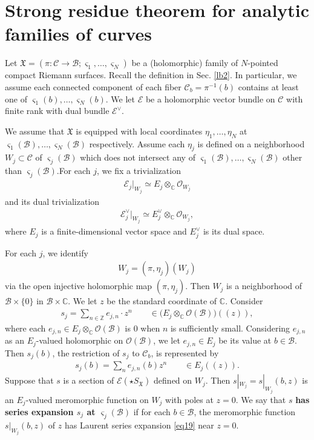 \documentclass[12pt,a4paper,notitlepage]{article}
\theoremstyle{definition}
\theoremstyle{plain}
\newcommand{\fk}{\mathfrak}
\newcommand{\mc}{\mathcal}
\newcommand{\scr}{\mathscr}
\newcommand{\sgm}{\varsigma}
\newcommand{\SX}{{S_{\fk X}}}
\newcommand{\Cbb}{\mathbb C}
\newcommand{\Zbb}{\mathbb Z}
\numberwithin{equation}{section}
\begin{document}
\appendix


\section{Strong residue theorem for analytic families of curves}\label{lb6}


Let $\fk X=(\pi:\mc C\rightarrow\mc B;\sgm_1,\dots,\sgm_N)$ be a (holomorphic) family of $N$-pointed compact Riemann surfaces. Recall the definition in Sec. \ref{lb2}. In particular, we assume each connected component of each fiber $\mc C_b=\pi^{-1}(b)$ contains at least one of $\sgm_1(b),\dots,\sgm_N(b)$. We let $\scr E$ be a holomorphic vector bundle on $\mc C$ with finite rank with dual bundle $\scr E^\vee$.

We assume that $\fk X$ is equipped with local coordinates $\eta_1,\dots,\eta_N$ at $\sgm_1(\mc B),\dots,\sgm_N(\mc B)$ respectively. Assume each $\eta_j$ is defined on a neighborhood $W_j\subset\mc C$ of $\sgm_j(\mc B)$ which does not intersect any of $\sgm_1(\mc B),\dots,\sgm_N(\mc B)$ other than $\sgm_j(\mc B)$.For each $j$, we fix a trivialization
\begin{align*}
\scr E_j|_{W_j}\simeq E_j\otimes_\Cbb\scr O_{W_j}	
\end{align*}
and its dual trivialization
\begin{align*}
\scr E_j^\vee|_{W_j}\simeq E_j^\vee\otimes_\Cbb\scr O_{W_j},	
\end{align*}
where $E_j$ is a finite-dimensional vector space and $E_j^\vee$ is its dual space.

For each $j$, we identify
\begin{align*}
W_j=(\pi,\eta_j)(W_j)	
\end{align*}
via the open injective holomorphic map $(\pi,\eta_j)$. Then $W_j$ is a neighborhood of $\mc B\times\{0\}$ in $\mc B\times\Cbb$. We let $z$ be the standard coordinate of $\Cbb$. Consider
\begin{gather}
s_j=\sum_{n\in\Zbb} e_{j,n}\cdot z^n\qquad \in\big(E_j\otimes_\Cbb\scr O(\mc B) \big)((z)),\label{eq19}	
\end{gather}
where each $e_{j,n}\in E_j\otimes_\Cbb\scr O(\mc B)$ is $0$ when $n$ is sufficiently small. Considering $e_{j,n}$ as an $E_j$-valued holomorphic on $\scr O(\mc B)$, we let $e_{j,n}\in E_j$ be its value at $b\in\mc B$. Then $s_j(b)$, the restriction of $s_j$ to $\mc C_b$, is represented by
\begin{align*}
s_j(b)=\sum_n e_{j,n}(b)z^n\qquad\in E_j((z)).	
\end{align*} 
Suppose that $s$ is a section of $\scr E(\star\SX)$ defined on $W_j$. Then $s|_{W_j}=s|_{W_j}(b,z)$ is an $E_j$-valued meromorphic function on $W_j$ with poles at $z=0$. We say that $s$ \textbf{has series expansion $s_j$ at $\sgm_j(\mc B)$} if for each $b\in\mc B$, the meromorphic function $s|_{W_j}(b,z)$ of $z$ has Laurent series expansion \eqref{eq19} near $z=0$.
\end{document}
